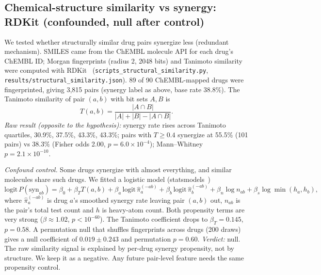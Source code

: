 \documentclass[11pt]{article}
\begin{document}
\subsection{Chemical-structure similarity vs synergy: RDKit (confounded, null after control)}
We tested whether structurally similar drug pairs synergize less (redundant mechanism). SMILES came from the ChEMBL molecule API for each drug's ChEMBL ID; Morgan fingerprints (radius 2, 2048 bits) and Tanimoto similarity were computed with RDKit~\cite{rdkit} (\texttt{scripts\_structural\_similarity.py}, \texttt{results/structural\_similarity.json}). 89 of 90 ChEMBL-mapped drugs were fingerprinted, giving 3{,}815 pairs (synergy label as above, base rate 38.8\%). The Tanimoto similarity of pair $(a,b)$ with bit sets $A,B$ is
\begin{equation} T(a,b)=\frac{|A\cap B|}{|A|+|B|-|A\cap B|}. \end{equation}
\emph{Raw result (opposite to the hypothesis):} synergy rate rises across Tanimoto quartiles, 30.9\%, 37.5\%, 43.3\%, 43.3\%; pairs with $T\geq 0.4$ synergize at 55.5\% (101 pairs) vs 38.3\% (Fisher odds 2.00, $p=6.0\times10^{-4}$); Mann--Whitney $p=2.1\times10^{-10}$.

\emph{Confound control.} Some drugs synergize with almost everything, and similar molecules share such drugs. We fitted a logistic model (statsmodels~\cite{statsmodels})
\begin{equation} \mathrm{logit}\,P(\mathrm{syn}_{ab}) = \beta_0 + \beta_T T(a,b) + \beta_a\,\mathrm{logit}\,\hat\pi_{a}^{(-ab)} + \beta_b\,\mathrm{logit}\,\hat\pi_{b}^{(-ab)} + \beta_n \log n_{ab} + \beta_s \log \min(h_a,h_b), \end{equation}
where $\hat\pi_{a}^{(-ab)}$ is drug $a$'s smoothed synergy rate leaving pair $(a,b)$ out, $n_{ab}$ is the pair's total test count and $h$ is heavy-atom count. Both propensity terms are very strong ($\beta\approx1.02$, $p<10^{-60}$). The Tanimoto coefficient drops to $\beta_T=0.145$, $p=0.58$.
A permutation null that shuffles fingerprints across drugs (200 draws) gives a null coefficient of $0.019\pm0.243$ and permutation $p=0.60$.
\emph{Verdict:} null. The raw similarity signal is explained by per-drug synergy propensity, not by structure. We keep it as a negative. Any future pair-level feature needs the same propensity control.
\end{document}
